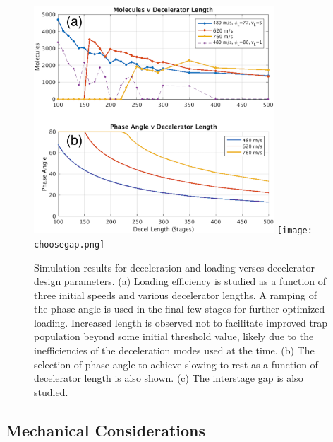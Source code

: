 \begin{figure}[t!]
\includegraphics[width=9cm]{Slowing/mp_elength_phaseload.png}
\texttt{[image: choosegap.png]}
\caption[Decelerator Length Simulation]{\label{fig:mp_elength_phaseload}
Simulation results for deceleration and loading verses decelerator design parameters. (a) Loading efficiency is studied as a function of three initial speeds and various decelerator lengths. A ramping of the phase angle is used in the final few stages for further optimized loading. Increased length is observed not to facilitate improved trap population beyond some initial threshold value, likely due to the inefficiencies of the deceleration modes used at the time. (b) The selection of phase angle to achieve slowing to rest as a function of decelerator length is also shown. (c) The interstage gap is also studied.}
\end{figure}



\subsection{Mechanical Considerations}\label{sec:mechconsider}

